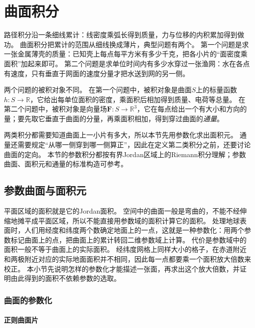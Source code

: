 \par{}
\section{曲面积分}
\label{sec:analysis-surface-integration}

路径积分沿一条细线累计：线密度乘弧长得到质量，力与位移的内积累加得到做功。
曲面积分把累计的范围从细线换成薄片，典型问题有两个。
第一个问题是求一张金属薄壳的质量：已知壳上每点每平方米有多少千克，把各小片的“面密度乘面积”加起来即可。
第二个问题是求单位时间内有多少水穿过一张渔网：水在各点有速度，只有垂直于网面的速度分量才把水送到网的另一侧。

两个问题的被积对象不同。
在第一个问题中，被积对象是曲面$S$上的标量函数$h:S\to\mathbb R$，它给出每单位面积的密度，乘面积后相加得到质量、电荷等总量。
在第二个问题中，被积对象是向量场$\bm F:S\to\mathbb R^3$，它在每点给出一个有大小和方向的量；要先取它垂直于曲面的分量，再乘面积相加，得到穿过曲面的\emph{通量}。

两类积分都需要知道曲面上一小片有多大，所以本节先用参数化求出面积元。
通量还需要规定“从哪一侧穿到哪一侧算正”，因此在定义第二类积分之前，还要讨论曲面的定向。
本节的参数积分都按有界Jordan区域上的Riemann积分理解；参数曲面、面积元和通量的标准构造可参考。

\subsection{参数曲面与面积元}

平面区域的面积就是它的Jordan面积。
空间中的曲面一般是弯曲的，不能不经伸缩地摊平成平面区域，所以不能直接用参数域的面积计算它的面积。
处理地球表面时，人们用经度和纬度两个数确定地面上的一点，这就是一种参数化：用两个参数标记曲面上的点，把曲面上的累计转回二维参数域上计算。
代价是参数域中的面积一般不等于曲面上的实际面积。
经纬度网格上同样大小的格子，在赤道附近和两极附近对应的实际地面面积并不相同，因此每一点都要乘一个面积放大倍数来校正。
本小节先说明怎样的参数化才能描述一张面，再求出这个放大倍数，并证明由此得到的面积不依赖参数的选取。

\subsubsection{曲面的参数化}

\paragraph{正则曲面片}

